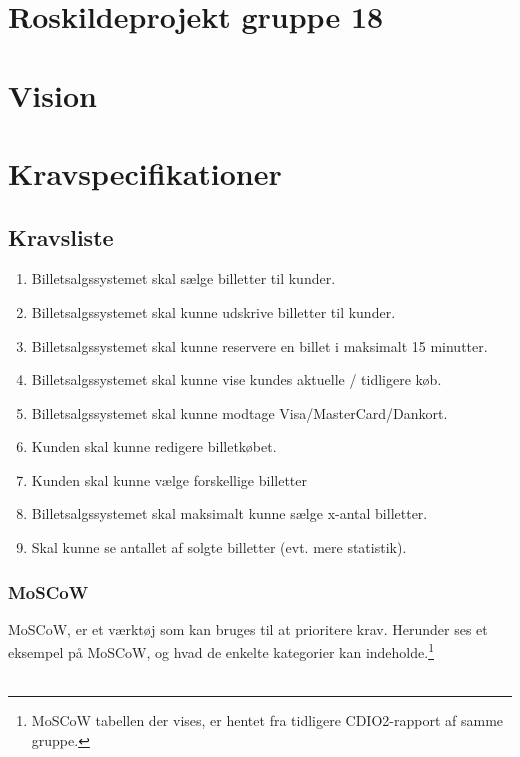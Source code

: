 


\section{Roskildeprojekt gruppe 18}

\section{Vision}

\section{Kravspecifikationer}

\subsection{Kravsliste}

\begin{enumerate}
    \item Billetsalgssystemet skal sælge billetter til kunder.
    \item Billetsalgssystemet skal kunne udskrive billetter til kunder.
    \item Billetsalgssystemet skal kunne reservere en billet i maksimalt 15 minutter.
    \item Billetsalgssystemet skal kunne vise kundes aktuelle / tidligere køb.
    \item Billetsalgssystemet skal kunne modtage Visa/MasterCard/Dankort.
    \item Kunden skal kunne redigere billetkøbet.
    \item Kunden skal kunne vælge forskellige billetter
    \item Billetsalgssystemet skal maksimalt kunne sælge x-antal billetter.
    \item Skal kunne se antallet af solgte billetter (evt. mere statistik).
\end{enumerate}

\subsubsection{MoSCoW}

MoSCoW, er et værktøj som kan bruges til at prioritere krav.
Herunder ses et eksempel på MoSCoW, og hvad de enkelte kategorier kan indeholde.\footnote{MoSCoW tabellen der vises, er hentet fra tidligere CDIO2-rapport af samme gruppe.} \\\\

